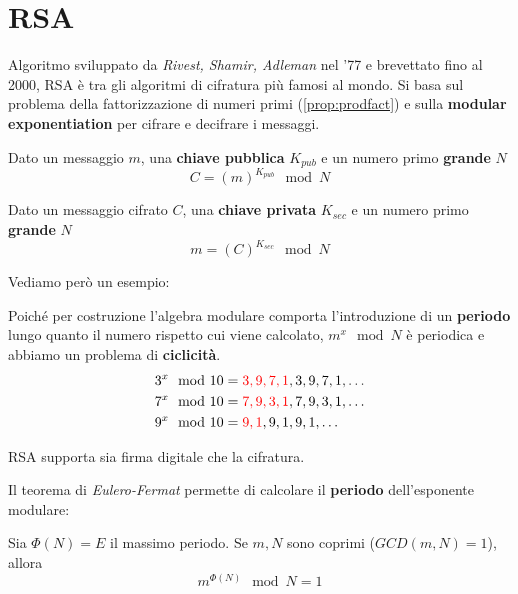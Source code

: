 \section{RSA}
Algoritmo sviluppato da \textit{Rivest, Shamir, Adleman} nel '77 e brevettato fino al 2000, RSA è tra gli algoritmi di cifratura più famosi al mondo. Si basa sul problema della fattorizzazione di numeri primi (\cref{prop:prodfact}) e sulla \textbf{modular exponentiation} per cifrare e decifrare i messaggi.
\begin{proposition}\label{prop:rsaenc}
Dato un messaggio $m$, una \textbf{chiave pubblica} $K_{pub}$ e un numero primo \textbf{grande} $N$
\begin{equation}
    C = (m)^{K_{pub}}\mod{N}
\end{equation}
\end{proposition}
\begin{proposition}\label{prop:rsadec}
Dato un messaggio cifrato $C$, una \textbf{chiave privata} $K_{sec}$ e un numero primo \textbf{grande} $N$
\begin{equation}
    m = (C)^{K_{sec}}\mod{N}
\end{equation}
\end{proposition}
Vediamo però un esempio:
\begin{example}
Poiché per costruzione l'algebra modulare comporta l'introduzione di un \textbf{periodo} lungo quanto il numero rispetto cui viene calcolato, $m^x\mod{N}$ è periodica e abbiamo un problema di \textbf{ciclicità}.
\begin{equation*}
    \begin{aligned}
    3^x\mod{10}&={\textcolor{red}{3,9,7,1},3,9,7,1,\dots}\\
    7^x\mod{10}&={\textcolor{red}{7,9,3,1},7,9,3,1,\dots}\\
    9^x\mod{10}&={\textcolor{red}{9,1},9,1,9,1,\dots}\\
    \end{aligned}
\end{equation*}
\end{example}
\begin{remark}
RSA supporta sia firma digitale che la cifratura.
\end{remark}
Il teorema di \textit{Eulero-Fermat} permette di calcolare il \textbf{periodo} dell'esponente modulare:
\begin{proposition}
Sia $\Phi(N)=E$ il massimo periodo. Se $m,N$ sono coprimi ($GCD(m,N)=1$), allora
\begin{equation}\label{eq:eulertot}
    m^{\Phi(N)}\mod{N}=1 
\end{equation}
\end{proposition}
